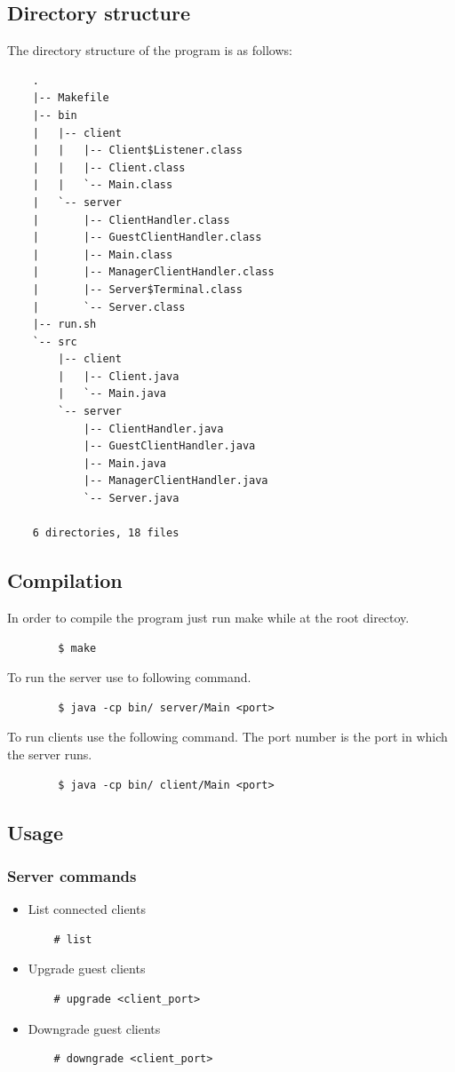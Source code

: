 \documentclass[titlepage]{article}
\begin{document}
    \subsection{Directory structure}
    The directory structure of the program is as follows:
    \begin{verbatim}
    .
    |-- Makefile
    |-- bin
    |   |-- client
    |   |   |-- Client$Listener.class
    |   |   |-- Client.class
    |   |   `-- Main.class
    |   `-- server
    |       |-- ClientHandler.class
    |       |-- GuestClientHandler.class
    |       |-- Main.class
    |       |-- ManagerClientHandler.class
    |       |-- Server$Terminal.class
    |       `-- Server.class
    |-- run.sh
    `-- src
        |-- client
        |   |-- Client.java
        |   `-- Main.java
        `-- server
            |-- ClientHandler.java
            |-- GuestClientHandler.java
            |-- Main.java
            |-- ManagerClientHandler.java
            `-- Server.java

    6 directories, 18 files
    \end{verbatim}

    \subsection{Compilation}
    In order to compile the program just run make while at the root directoy.
    \begin{verbatim}
        $ make
    \end{verbatim}

    To run the server use to following command.
    \begin{verbatim}
        $ java -cp bin/ server/Main <port>
    \end{verbatim}

    To run clients use the following command.
    The port number is the port in which the server runs.
    \begin{verbatim}
        $ java -cp bin/ client/Main <port>
    \end{verbatim}

    \subsection{Usage}
    \subsubsection{Server commands}
    \begin{itemize}
    \item List connected clients
    \begin{verbatim}
    # list
    \end{verbatim}
    \item Upgrade guest clients
    \begin{verbatim}
    # upgrade <client_port>
    \end{verbatim}
    \item Downgrade guest clients
    \begin{verbatim}
    # downgrade <client_port>
    \end{verbatim}
    \end{itemize}
\end{document}

